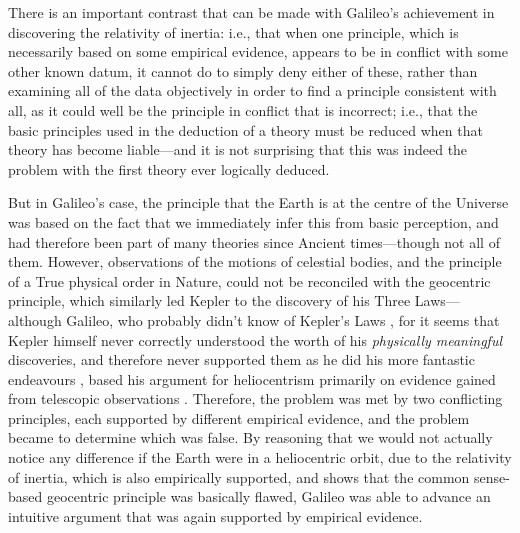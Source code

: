 There is an important contrast that can be made with Galileo's achievement in discovering the relativity of inertia: i.e., that when one principle, which is necessarily based on some empirical evidence, appears to be in conflict with some other known datum, it cannot do to simply deny either of these, rather than examining all of the data objectively in order to find a principle consistent with all, as it could well be the principle in conflict that is incorrect; i.e., that the basic principles used in the deduction of a theory must be reduced when that theory has become liable---and it is not surprising that this was indeed the problem with the first theory ever logically deduced. 

But in Galileo's case, the principle that the Earth is at the centre of the Universe was based on the fact that we immediately infer this from basic perception, and had therefore been part of many theories since Ancient times---though not all of them. However, observations of the motions of celestial bodies, and the principle of a True physical order in Nature, could not be reconciled with the geocentric principle, which similarly led Kepler to the discovery of his Three Laws---although Galileo, who probably didn't know of Kepler's Laws \cite{deSantillana1955}, for it seems that Kepler himself never correctly understood the worth of his \textit{physically meaningful} discoveries, and therefore never supported them as he did his more fantastic endeavours \cite{Koestler1959}, based his argument for heliocentrism primarily on evidence gained from telescopic observations \cite{Galileo1967}. Therefore, the problem was met by two conflicting principles, each supported by different empirical evidence, and the problem became to determine which was false. By reasoning that we would not actually notice any difference if the Earth were in a heliocentric orbit, due to the relativity of inertia, which is also empirically supported, and shows that the common sense-based geocentric principle was basically flawed, Galileo was able to advance an intuitive argument that was again supported by empirical evidence.


